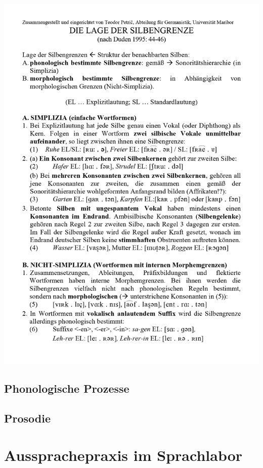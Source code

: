 \documentclass[
  letterpaper,
]{scrbook}
\begin{document}
\includegraphics[width=1\textwidth,height=\textheight]{./pictures/04_Die_Lage_der_Silbengrenze_page-0001.jpg}

\hypertarget{phonologische-prozesse}{%
\chapter{Phonologische Prozesse}\label{phonologische-prozesse}}

\hypertarget{prosodie-1}{%
\chapter{Prosodie}\label{prosodie-1}}

\part{Aussprachepraxis im Sprachlabor}
\end{document}
